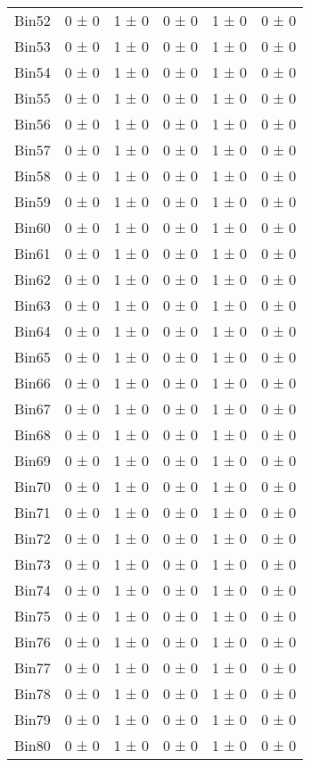 \begin{tabular}{@{\extracolsep{4pt}}lccccc@{}}
     Bin52 & 0 ± 0 & 1 ± 0 & 0 ± 0 & 1 ± 0 & 0 ± 0 \\ 
     Bin53 & 0 ± 0 & 1 ± 0 & 0 ± 0 & 1 ± 0 & 0 ± 0 \\ 
     Bin54 & 0 ± 0 & 1 ± 0 & 0 ± 0 & 1 ± 0 & 0 ± 0 \\ 
     Bin55 & 0 ± 0 & 1 ± 0 & 0 ± 0 & 1 ± 0 & 0 ± 0 \\ 
     Bin56 & 0 ± 0 & 1 ± 0 & 0 ± 0 & 1 ± 0 & 0 ± 0 \\ 
     Bin57 & 0 ± 0 & 1 ± 0 & 0 ± 0 & 1 ± 0 & 0 ± 0 \\ 
     Bin58 & 0 ± 0 & 1 ± 0 & 0 ± 0 & 1 ± 0 & 0 ± 0 \\ 
     Bin59 & 0 ± 0 & 1 ± 0 & 0 ± 0 & 1 ± 0 & 0 ± 0 \\ 
     Bin60 & 0 ± 0 & 1 ± 0 & 0 ± 0 & 1 ± 0 & 0 ± 0 \\ 
     Bin61 & 0 ± 0 & 1 ± 0 & 0 ± 0 & 1 ± 0 & 0 ± 0 \\ 
     Bin62 & 0 ± 0 & 1 ± 0 & 0 ± 0 & 1 ± 0 & 0 ± 0 \\ 
     Bin63 & 0 ± 0 & 1 ± 0 & 0 ± 0 & 1 ± 0 & 0 ± 0 \\ 
     Bin64 & 0 ± 0 & 1 ± 0 & 0 ± 0 & 1 ± 0 & 0 ± 0 \\ 
     Bin65 & 0 ± 0 & 1 ± 0 & 0 ± 0 & 1 ± 0 & 0 ± 0 \\ 
     Bin66 & 0 ± 0 & 1 ± 0 & 0 ± 0 & 1 ± 0 & 0 ± 0 \\ 
     Bin67 & 0 ± 0 & 1 ± 0 & 0 ± 0 & 1 ± 0 & 0 ± 0 \\ 
     Bin68 & 0 ± 0 & 1 ± 0 & 0 ± 0 & 1 ± 0 & 0 ± 0 \\ 
     Bin69 & 0 ± 0 & 1 ± 0 & 0 ± 0 & 1 ± 0 & 0 ± 0 \\ 
     Bin70 & 0 ± 0 & 1 ± 0 & 0 ± 0 & 1 ± 0 & 0 ± 0 \\ 
     Bin71 & 0 ± 0 & 1 ± 0 & 0 ± 0 & 1 ± 0 & 0 ± 0 \\ 
     Bin72 & 0 ± 0 & 1 ± 0 & 0 ± 0 & 1 ± 0 & 0 ± 0 \\ 
     Bin73 & 0 ± 0 & 1 ± 0 & 0 ± 0 & 1 ± 0 & 0 ± 0 \\ 
     Bin74 & 0 ± 0 & 1 ± 0 & 0 ± 0 & 1 ± 0 & 0 ± 0 \\ 
     Bin75 & 0 ± 0 & 1 ± 0 & 0 ± 0 & 1 ± 0 & 0 ± 0 \\ 
     Bin76 & 0 ± 0 & 1 ± 0 & 0 ± 0 & 1 ± 0 & 0 ± 0 \\ 
     Bin77 & 0 ± 0 & 1 ± 0 & 0 ± 0 & 1 ± 0 & 0 ± 0 \\ 
     Bin78 & 0 ± 0 & 1 ± 0 & 0 ± 0 & 1 ± 0 & 0 ± 0 \\ 
     Bin79 & 0 ± 0 & 1 ± 0 & 0 ± 0 & 1 ± 0 & 0 ± 0 \\ 
     Bin80 & 0 ± 0 & 1 ± 0 & 0 ± 0 & 1 ± 0 & 0 ± 0 \\ 
\hline\hline
  \end{tabular}
